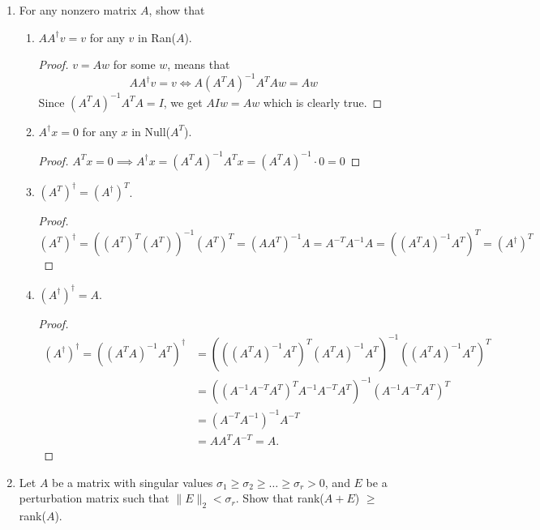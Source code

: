 \documentclass[11pt]{article}
\begin{document}
\begin{enumerate}
	\item For any nonzero matrix \(A\), show that
	      \begin{enumerate}
		      \item \(AA^\dag v = v\) for any \(v\) in Ran(\(A\)).
            \begin{proof}
              \(v = Aw\) for some \(w\), means that
              \[A A^\dag v = v \iff A (A^T A)^{-1} A^T A w = Aw\]
              Since \((A^T A)^{-1} A^T A = I\), we get \(AIw = Aw\) which is clearly true.
            \end{proof}
		      \item \(A^\dag x = 0\) for any \(x\) in Null(\(A^T\)).
            \begin{proof}
              \(A^T x = 0 \implies A^\dag x = (A^T A)^{-1} A^T x = (A^T A)^{-1} \cdot 0 = 0\)
            \end{proof}
		      \item \((A^T)^\dag = (A^\dag)^T\).
            \begin{proof}
              \((A^T)^\dag = ((A^T)^T (A^T))^{-1} (A^T)^T = (A A^T)^{-1} A = A^{-T}A^{-1}A = ((A^T A)^{-1} A^T)^T = (A^\dag)^T\)
            \end{proof}
		      \item \((A^\dag)^\dag = A\).
            \begin{proof} \begin{align*}
                (A^\dag)^\dag = ((A^T A)^{-1} A^T)^\dag &= (((A^T A)^{-1} A^T)^T (A^T A)^{-1} A^T)^{-1} ((A^T A)^{-1} A^T)^T \\
                &= ((A^{-1} A^{-T} A^T)^T A^{-1} A^{-T} A^T)^{-1} (A^{-1} A^{-T} A^T)^T \\
                &= (A^{-T} A^{-1})^{-1} A^{-T} \\
                &= A A^T A^{-T} = A.
              \end{align*}
            \end{proof}
	      \end{enumerate}

	\item Let \(A\) be a matrix with singular values \(\sigma_1 \geq \sigma_2 \geq \dots \geq \sigma_r > 0\), and \(E\) be a perturbation matrix such that \(\lVert E \rVert_2 < \sigma_r\).  Show that rank(\(A+E\)) \(\geq\) rank(\(A\)).


\end{enumerate}
\end{document}
